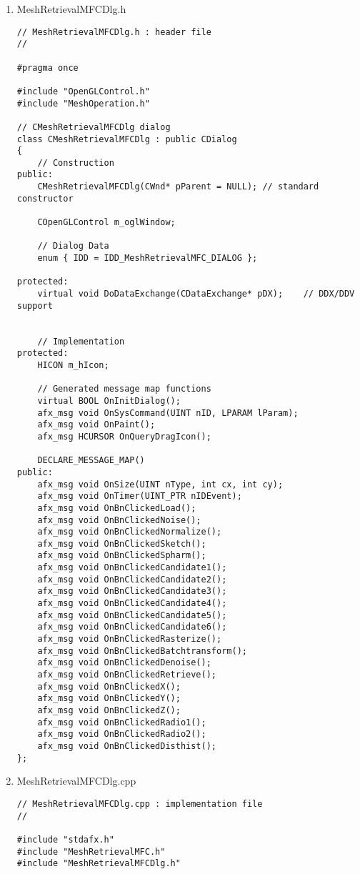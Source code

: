 \begin{enumerate}[1.]
\begin{lstlisting}[xleftmargin=0em]
\end{lstlisting}

\item MeshRetrievalMFCDlg.h

\begin{lstlisting}[xleftmargin=0em]
// MeshRetrievalMFCDlg.h : header file
//

#pragma once

#include "OpenGLControl.h"
#include "MeshOperation.h"

// CMeshRetrievalMFCDlg dialog
class CMeshRetrievalMFCDlg : public CDialog
{
	// Construction
public:
	CMeshRetrievalMFCDlg(CWnd* pParent = NULL);	// standard constructor

	COpenGLControl m_oglWindow;

	// Dialog Data
	enum { IDD = IDD_MeshRetrievalMFC_DIALOG };

protected:
	virtual void DoDataExchange(CDataExchange* pDX);	// DDX/DDV support


	// Implementation
protected:
	HICON m_hIcon;

	// Generated message map functions
	virtual BOOL OnInitDialog();
	afx_msg void OnSysCommand(UINT nID, LPARAM lParam);
	afx_msg void OnPaint();
	afx_msg HCURSOR OnQueryDragIcon();

	DECLARE_MESSAGE_MAP()
public:
	afx_msg void OnSize(UINT nType, int cx, int cy);
	afx_msg void OnTimer(UINT_PTR nIDEvent);
	afx_msg void OnBnClickedLoad();
	afx_msg void OnBnClickedNoise();
	afx_msg void OnBnClickedNormalize();
	afx_msg void OnBnClickedSketch();
	afx_msg void OnBnClickedSpharm();
	afx_msg void OnBnClickedCandidate1();
	afx_msg void OnBnClickedCandidate2();
	afx_msg void OnBnClickedCandidate3();
	afx_msg void OnBnClickedCandidate4();
	afx_msg void OnBnClickedCandidate5();
	afx_msg void OnBnClickedCandidate6();
	afx_msg void OnBnClickedRasterize();
	afx_msg void OnBnClickedBatchtransform();
	afx_msg void OnBnClickedDenoise();
	afx_msg void OnBnClickedRetrieve();
	afx_msg void OnBnClickedX();
	afx_msg void OnBnClickedY();
	afx_msg void OnBnClickedZ();
	afx_msg void OnBnClickedRadio1();
	afx_msg void OnBnClickedRadio2();
	afx_msg void OnBnClickedDisthist();
};
\end{lstlisting}

\item MeshRetrievalMFCDlg.cpp

\begin{lstlisting}[xleftmargin=0em]
// MeshRetrievalMFCDlg.cpp : implementation file
//

#include "stdafx.h"
#include "MeshRetrievalMFC.h"
#include "MeshRetrievalMFCDlg.h"




\end{lstlisting}
\end{enumerate}
